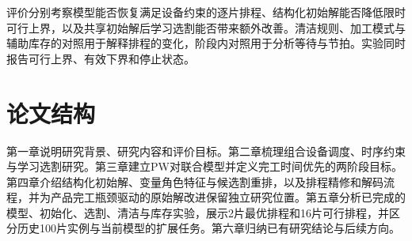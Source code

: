评价分别考察模型能否恢复满足设备约束的逐片排程、结构化初始解能否降低限时可行上界，以及共享初始解后学习选割能否带来额外改善。清洁规则、加工模式与辅助库存的对照用于解释排程的变化，阶段内对照用于分析等待与节拍。实验同时报告可行上界、有效下界和停止状态。
\section{论文结构}
第一章说明研究背景、研究内容和评价目标。第二章梳理组合设备调度、时序约束与学习选割研究。第三章建立PW对联合模型并定义完工时间优先的两阶段目标。第四章介绍结构化初始解、变量角色特征与候选割重排，以及排程精修和解码流程，并为产品完工瓶颈驱动的原始解改进保留独立研究位置。第五章分析已完成的模型、初始化、选割、清洁与库存实验，展示2片最优排程和16片可行排程，并区分历史100片实例与当前模型的扩展任务。第六章归纳已有研究结论与后续方向。
